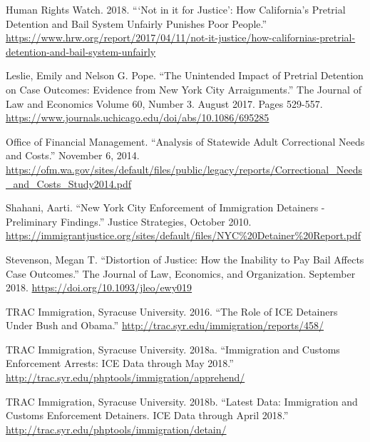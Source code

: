 \documentclass[12pt]{report}\usepackage[]{graphicx}\usepackage[]{color}
\begin{document}
\vspace{4mm}

Human Rights Watch. 2018. ``‘Not in it for Justice': How California's Pretrial Detention and Bail System Unfairly Punishes Poor People.'' \url{https://www.hrw.org/report/2017/04/11/not-it-justice/how-californias-pretrial-detention-and-bail-system-unfairly}

\vspace{4mm}

Leslie, Emily and Nelson G. Pope. ``The Unintended Impact of Pretrial Detention on Case Outcomes: Evidence from New York City Arraignments.'' The Journal of Law and Economics Volume 60, Number 3. August 2017. Pages 529-557. \url{https://www.journals.uchicago.edu/doi/abs/10.1086/695285}

\vspace{4mm}

Office of Financial Management. ``Analysis of Statewide Adult Correctional Needs and Costs.'' November 6, 2014. \url{https://ofm.wa.gov/sites/default/files/public/legacy/reports/Correctional_Needs_and_Costs_Study2014.pdf}

\vspace{4mm}

Shahani, Aarti. ``New York City Enforcement of Immigration Detainers - Preliminary Findings.'' Justice Strategies, October 2010. \url{https://immigrantjustice.org/sites/default/files/NYC%20Detainer%20Report.pdf}

\vspace{4mm}

Stevenson, Megan T. ``Distortion of Justice: How the Inability to Pay Bail Affects Case Outcomes.'' The Journal of Law, Economics, and Organization. September 2018. \url{https://doi.org/10.1093/jleo/ewy019}

\vspace{4mm}

TRAC Immigration, Syracuse University. 2016. ``The Role of ICE Detainers Under Bush and Obama.'' \url{http://trac.syr.edu/immigration/reports/458/}

\vspace{4mm}

TRAC Immigration, Syracuse University. 2018a. ``Immigration and Customs Enforcement Arrests: ICE Data through May 2018.'' \url{http://trac.syr.edu/phptools/immigration/apprehend/}

\vspace{4mm}

TRAC Immigration, Syracuse University. 2018b. ``Latest Data: Immigration and Customs Enforcement Detainers. ICE Data through April 2018.'' \url{http://trac.syr.edu/phptools/immigration/detain/}
\end{document}
